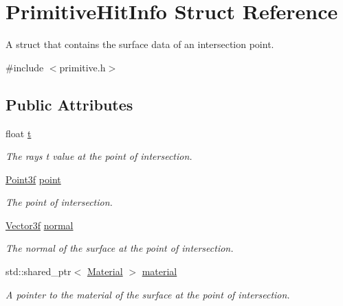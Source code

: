 \hypertarget{struct_primitive_hit_info}{}\section{Primitive\+Hit\+Info Struct Reference}
\label{struct_primitive_hit_info}


A struct that contains the surface data of an intersection point.  




{\ttfamily \#include $<$primitive.\+h$>$}

\subsection*{Public Attributes}
\begin{DoxyCompactItemize}
\item 
\mbox{\label{struct_primitive_hit_info_a78063af1d88a6dc345df11a61ff4e8df}} 
float \mbox{\hyperlink{struct_primitive_hit_info_a78063af1d88a6dc345df11a61ff4e8df}{t}}
\begin{DoxyCompactList}\small\item\em The ray\textquotesingle{}s t value at the point of intersection. \end{DoxyCompactList}\item 
\mbox{\label{struct_primitive_hit_info_a58c7eb41cc6ca6e7564c3942d14beded}} 
\mbox{\hyperlink{class_point}{Point3f}} \mbox{\hyperlink{struct_primitive_hit_info_a58c7eb41cc6ca6e7564c3942d14beded}{point}}
\begin{DoxyCompactList}\small\item\em The point of intersection. \end{DoxyCompactList}\item 
\mbox{\label{struct_primitive_hit_info_a7231db32c4114cb60ce9906019303788}} 
\mbox{\hyperlink{class_vector3}{Vector3f}} \mbox{\hyperlink{struct_primitive_hit_info_a7231db32c4114cb60ce9906019303788}{normal}}
\begin{DoxyCompactList}\small\item\em The normal of the surface at the point of intersection. \end{DoxyCompactList}\item 
\mbox{\label{struct_primitive_hit_info_a861f08df1507ac0fdebd1f3b3892ad58}} 
std\+::shared\+\_\+ptr$<$ \mbox{\hyperlink{class_material}{Material}} $>$ \mbox{\hyperlink{struct_primitive_hit_info_a861f08df1507ac0fdebd1f3b3892ad58}{material}}
\begin{DoxyCompactList}\small\item\em A pointer to the material of the surface at the point of intersection. \end{DoxyCompactList}\end{DoxyCompactItemize}


